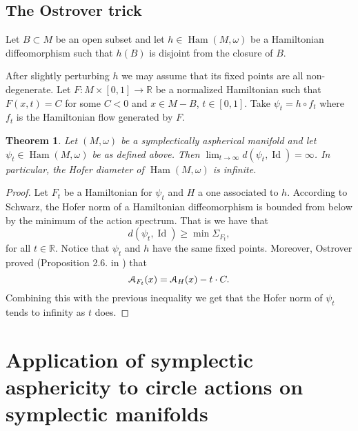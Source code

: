 \documentclass[12pt]{amsart}
\newcommand{\B}[1]{{\mathbb #1}}
\newcommand{\C}[1]{{\EuScript #1}}
\newtheorem{theorem}[subsection]{Theorem}%
\numberwithin{equation}{section}
\theoremstyle{definition}
\theoremstyle{remark}
\numberwithin{figure}{section}
\numberwithin{table}{section}
\newcommand{\Si}{{\Sigma}}
\newcommand{\Mo}{(M,\omega )}
\newcommand\Ham{\operatorname{Ham}}
\newcommand\id{\operatorname{Id}}
\begin{document}
\subsection{The Ostrover trick \cite{Os}} 
\label{SS:ostrover} 
 
Let $B\subset M$ be an open subset and let $h\in \Ham\Mo$ be a 
Hamiltonian diffeomorphism such that $h(B)$ is disjoint from 
the closure of $B$. 
 
After slightly perturbing $h$  we may assume that its fixed 
points are all non-degenerate. 
Let $F:M\times [0,1]\to \B R$ be a normalized Hamiltonian  
such that $F(x,t)= C$ for some $C<0$ and $x\in M-B$, $t\in [0,1]$.  
Take $\psi_t=h\circ f_t$ where $f_t$ is the Hamiltonian  
flow generated by $F$. 
 
\begin{theorem}\label{T:ostrover} 
Let $\Mo$ be a symplectically aspherical manifold and 
let $\psi_t\in \Ham\Mo$ be as defined above. 
Then $\lim _{t\to \infty}d(\psi_t,\id)=\infty$. 
In particular, the Hofer diameter of $\Ham\Mo$ 
is infinite. 
\end{theorem} 
 
\begin{proof} 
Let $F_t$ be a Hamiltonian for $\psi_t$ and $H$ a one associated 
to $h$. 
According to Schwarz, the Hofer norm of a Hamiltonian 
diffeomorphism is bounded from below by the minimum 
of the action spectrum. That is we have that 
$$ 
d(\psi_t,\id) \geq \min\Si_{F_t}, 
$$ 
for all $t\in \B R$. 
Notice that $\psi_t$ and $h$ have the same fixed points. 
Moreover, Ostrover proved (Proposition 2.6. in \cite{Os}) that 
$$ 
\C A_{F_t}(x)=\C A_H(x) - t\cdot C. 
$$ 
Combining this with the previous inequality we get 
that the Hofer norm of $\psi_t$ tends to infinity as $t$ does. 
\end{proof} 
 
\section{Application of symplectic asphericity to circle actions on symplectic  
manifolds} 
 
\end{document}
